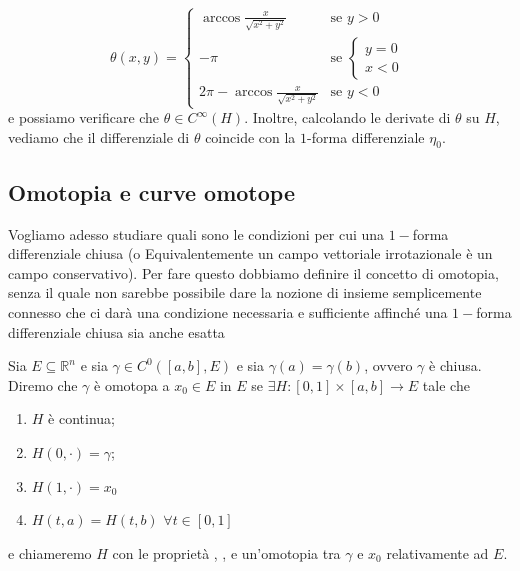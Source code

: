 \begin{remark}
\begin{equation*}
\theta(x, y) = \begin{cases}
	\arccos{\frac{x}{\sqrt{x^2 + y^2}}} & \text{se } y > 0 \\
	-\pi & \text{se } \begin{cases} y = 0 \\ x < 0 \end{cases} \\
	2 \pi - \arccos{\frac{x}{\sqrt{x^2+y^2}}} & \text{se } y < 0 
\end{cases}
\end{equation*}
e possiamo verificare che $\theta \in C^\infty(H)$. Inoltre, calcolando le derivate di $\theta$ su $H$, vediamo che il differenziale di $\theta$ coincide con la $1$-forma differenziale $\eta_0$.
\end{remark}

\vspace{0.5cm}
\subsection{Omotopia e curve omotope}
Vogliamo adesso studiare quali sono le condizioni per cui una $1-$forma differenziale chiusa (o Equivalentemente un campo vettoriale irrotazionale è un campo conservativo). Per fare questo dobbiamo definire
il concetto di omotopia, senza il quale non sarebbe possibile dare la nozione di insieme semplicemente connesso che ci darà una condizione necessaria e sufficiente affinché una $1-$forma differenziale chiusa sia anche esatta

\vspace{0.5cm}
\begin{definition}[\textcolor{blue}{omotopia}]
	Sia $E \subseteq \mathbb{R}^n$ e sia $\gamma \in C^0([a, b], E)$ e sia $\gamma(a) = \gamma(b)$, ovvero $\gamma$ è chiusa. Diremo che $\gamma$
	è omotopa a $x_0 \in E$ in $E$ se $\exists H:[0,1] \times [a, b] \to E$ tale che
	\begin{enumerate}[label=\protect\circled{\arabic*}]
		\item $H$ è continua;
		\item $H(0, \cdot) = \gamma$;
		\item $H(1, \cdot) = x_0$
		\item $H(t, a) = H(t, b) \, \, \forall t \in [0, 1]$
	\end{enumerate}
	e chiameremo $H$ con le proprietà , ,  e  un'omotopia tra $\gamma$ e $x_0$ relativamente ad $E$.
\end{definition}

